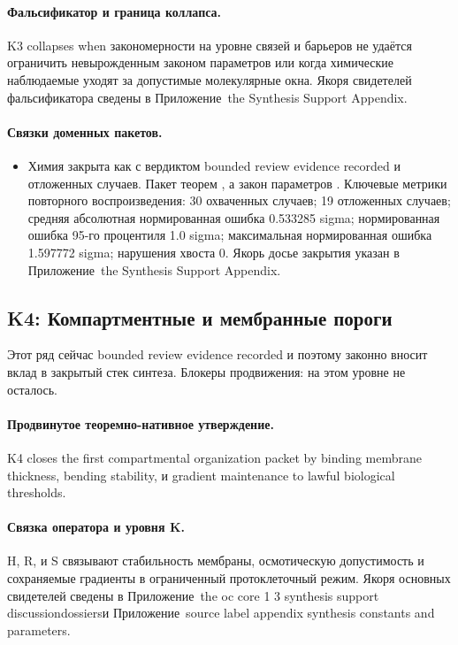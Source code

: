 \paragraph{Фальсификатор и граница коллапса.}
K3 collapses when закономерности на уровне связей и барьеров не удаётся ограничить невырожденным законом параметров или когда химические наблюдаемые уходят за допустимые молекулярные окна.
Якоря свидетелей фальсификатора сведены в Приложение~the Synthesis Support Appendix.

\paragraph{Связки доменных пакетов.}
\begin{itemize}[leftmargin=1.6em,nosep]
\item Химия закрыта как  с вердиктом bounded review evidence recorded и  отложенных случаев. Пакет теорем , а закон параметров . Ключевые метрики повторного воспроизведения: 30 охваченных случаев; 19 отложенных случаев; средняя абсолютная нормированная ошибка 0.533285 sigma; нормированная ошибка 95-го процентиля 1.0 sigma; максимальная нормированная ошибка 1.597772 sigma; нарушения хвоста 0. Якорь досье закрытия указан в Приложение~the Synthesis Support Appendix.
\end{itemize}

\subsection{K4: Компартментные и мембранные пороги}
\label{sec:oc-core-1-3-synthesis-k4}
Этот ряд сейчас bounded review evidence recorded и поэтому законно вносит вклад в закрытый стек синтеза.
Блокеры продвижения: на этом уровне не осталось.

\paragraph{Продвинутое теоремно-нативное утверждение.}
K4 closes the first compartmental organization packet by binding membrane thickness, bending stability, и gradient maintenance to lawful biological thresholds.

\paragraph{Связка оператора и уровня K.}
H, R, и S связывают стабильность мембраны, осмотическую допустимость и сохраняемые градиенты в ограниченный протоклеточный режим.
Якоря основных свидетелей сведены в Приложение~the oc core 1 3 synthesis support discussiondossiersи Приложение~source label appendix synthesis constants and parameters.

